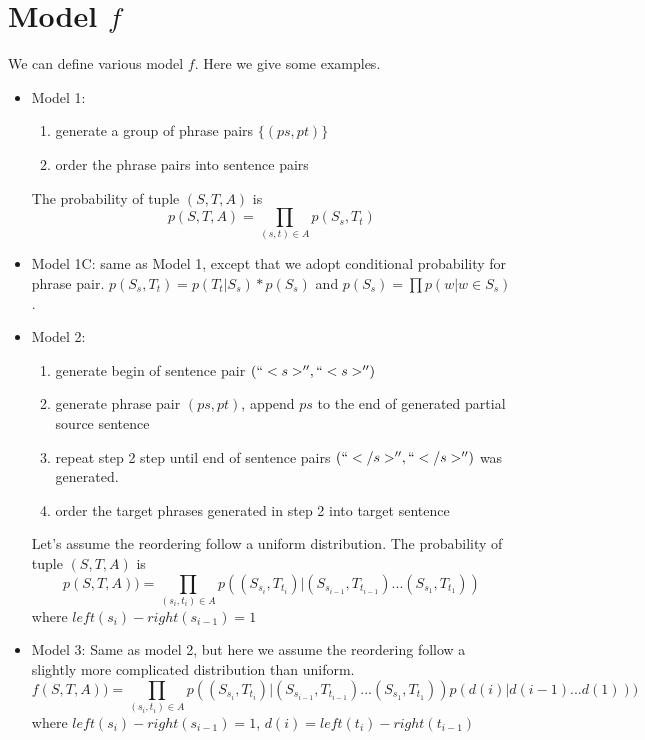 \documentclass[11pt, letterpaper]{article}   	%
\begin{document}
\section{Model $f$} 
We can define various model $f$. Here we give some examples.
\begin{itemize}

\item Model 1:
\begin{enumerate}
\item generate a group of phrase pairs $\{(ps,pt)\}$
\item order the phrase pairs into sentence pairs
\end{enumerate}

The probability of tuple $(S,T,A)$ is 
\begin{equation} \label{eq:obj1}
p(S,T,A)=\prod_{(s,t)\in A}p(S_s,T_t)
\end{equation}

\item Model 1C:
same as Model 1, except that we adopt conditional probability for phrase pair. $p(S_s,T_t)=p(T_t|S_s)*p(S_s)$ and $p(S_s)=\prod p(w|w\in S_s)$.

\item Model 2:

\begin{enumerate}
\item generate begin of sentence pair $(``<s>'',``<s>'')$
\item generate phrase pair $(ps,pt)$, append $ps$ to the end of generated partial source sentence
\item repeat step 2 step until end of sentence pairs $(``</s>'',``</s>'')$ was generated.
\item order the target phrases generated in step 2 into target sentence
\end{enumerate}

Let's assume the reordering follow a uniform distribution.
The probability of tuple $(S,T,A)$ is 
\begin{equation} \label{eq:obj2}
p(S,T,A))=\prod_{(s_i,t_i) \in A} p((S_{s_i},T_{t_i})| (S_{s_{i-1}},T_{t_{i-1}}) ... (S_{s_{1}},T_{t_{1}}))
\end{equation}
where $left(s_i)- right(s_{i-1})=1$

\item Model 3:
Same as model 2, but here we assume the reordering follow a slightly more complicated distribution than uniform.
\begin{equation} \label{eq:obj3}
f(S,T,A))=\prod_{(s_i,t_i) \in A} p((S_{s_i},T_{t_i})| (S_{s_{i-1}},T_{t_{i-1}}) ... (S_{s_{1}},T_{t_{1}})) p(d(i) | d(i-1) ... d(1)) )
\end{equation}
where $left(s_i)- right(s_{i-1})=1$, \quad $d(i)=left(t_i)- right(t_{i-1})$
\end{itemize}
\end{document}
